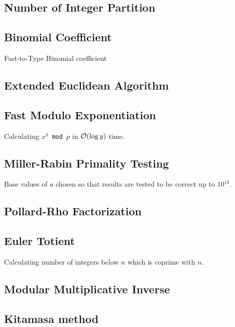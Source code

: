 \documentclass[landscape,8pt]{article}
\begin{document}
\begin{multicols}{2}
  \subsection{Number of Integer Partition}
    

  \subsection{Binomial Coefficient}
    Fast-to-Type Binomial coefficient
  \subsection{Extended Euclidean Algorithm}
    
  \subsection{Fast Modulo Exponentiation}
  Calculating \texttt{$x^y$ mod $p$} in $\order{\log y}$ time.
    

  \subsection{Miller-Rabin Primality Testing}
  Base values of $a$ chosen so that results are tested to be correct up to $10^14$.
    

  \subsection{Pollard-Rho Factorization}
    

  \subsection{Euler Totient}
  Calculating number of integers below $n$ which is coprime with $n$.
    

  \subsection{Modular Multiplicative Inverse}
    

  \subsection{Kitamasa method}


\end{multicols}
\end{document}
